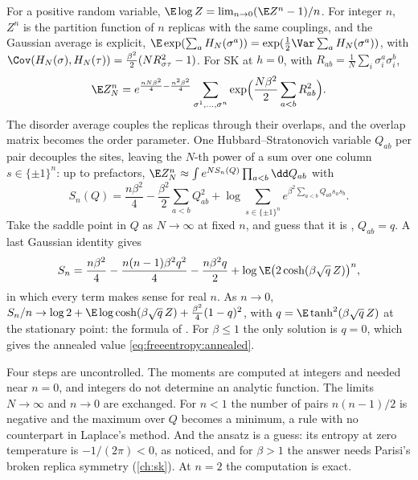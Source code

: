 \begin{refsection}
\begin{heuristic}
For a positive random variable, $\E\log Z=\lim_{n\to0}(\E Z^n-1)/n$. For integer $n$, $Z^n$ is the partition function of $n$ replicas with the same couplings, and the Gaussian average is explicit, $\E\exp(\sum_aH_N(\sigma^a))=\exp(\frac12\Var\sum_aH_N(\sigma^a))$, with $\Cov(H_N(\sigma),H_N(\tau))=\frac{\beta^2}2(NR_{\sigma\tau}^2-1)$. For SK at $h=0$, with $R_{ab}=\frac1N\sum_i\sigma_i^a\sigma_i^b$,
\begin{equation}\label{eq:freeentropy:replicamoment}
\E Z_N^n=e^{\frac{nN\beta^2}4-\frac{n^2\beta^2}4}\sum_{\sigma^1,\dots,\sigma^n}\exp\Bigl(\frac{N\beta^2}2\sum_{a<b}R_{ab}^2\Bigr).
\end{equation}
The disorder average couples the replicas through their overlaps, and the overlap matrix becomes the order parameter. One Hubbard--Stratonovich variable $Q_{ab}$ per pair decouples the sites, leaving the $N$-th power of a sum over one column $s\in\{\pm1\}^n$: up to prefactors, $\E Z_N^n\approx\int e^{NS_n(Q)}\prod_{a<b}\dd Q_{ab}$ with
\[
S_n(Q)=\frac{n\beta^2}4-\frac{\beta^2}2\sum_{a<b}Q_{ab}^2+\log\sum_{s\in\{\pm1\}^n}e^{\beta^2\sum_{a<b}Q_{ab}s_as_b}.
\]
Take the saddle point in $Q$ as $N\to\infty$ at fixed $n$, and guess that it is , $Q_{ab}=q$. A last Gaussian identity gives
\[
S_n=\frac{n\beta^2}4-\frac{n(n-1)\beta^2q^2}4-\frac{n\beta^2q}2+\log\E\bigl(2\cosh(\beta\sqrt q\,Z)\bigr)^n,
\]
in which every term makes sense for real $n$. As $n\to0$, $S_n/n\to\log2+\E\log\cosh(\beta\sqrt q\,Z)+\frac{\beta^2}4(1-q)^2$, with $q=\E\tanh^2(\beta\sqrt q\,Z)$ at the stationary point: the formula of \textcite{SherringtonKirkpatrick1975}. For $\beta\le1$ the only solution is $q=0$, which gives the annealed value \eqref{eq:freeentropy:annealed}.
\end{heuristic}

Four steps are uncontrolled. The moments are computed at integers and needed near $n=0$, and integers do not determine an analytic function. The limits $N\to\infty$ and $n\to0$ are exchanged. For $n<1$ the number of pairs $n(n-1)/2$ is negative and the maximum over $Q$ becomes a minimum, a rule with no counterpart in Laplace's method. And the ansatz is a guess: its entropy at zero temperature is $-1/(2\pi)<0$, as \textcite{SherringtonKirkpatrick1975} noticed, and for $\beta>1$ the answer needs Parisi's broken replica symmetry \parencite{Parisi1979b} (\cref{ch:sk}). At $n=2$ the computation is exact.


\end{refsection}

